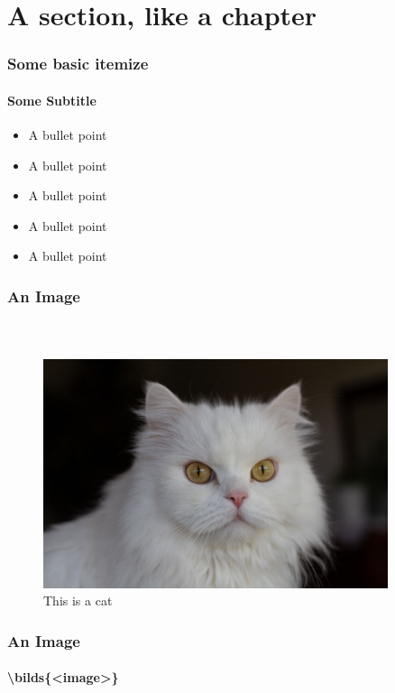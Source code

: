 

\section{A section, like a chapter}

\begin{frame}
\frametitle{Some basic itemize}
\framesubtitle{Some Subtitle}

\begin{itemize}
\item A bullet point  \okay
\item A bullet point  
\item A bullet point  
\item A bullet point  
\item A bullet point  
\end{itemize}
\end{frame}



\begin{frame}
\frametitle{An Image}
\framesubtitle{~}

\begin{center}
\begin{figure}
\includegraphics[width=0.9\textwidth]{Images/testimage}
\caption{This is a cat}\label{fig:cat}
\end{figure}
\end{center}

\end{frame}


\begin{frame}
\frametitle{An Image}
\framesubtitle{\textbackslash bilds\{<image>\}}


\end{frame}


